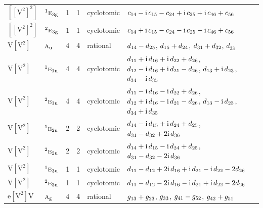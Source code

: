 \documentclass[10pt,a4paper]{article}
\numberwithin{equation}{section}
\newcommand{\irr}[1]{\text{\normalfont\scshape #1}}
\newcommand{\conjpair}[1]{{}^{#1}}
\newcommand{\ptag}[1]{\mathrm{#1}}
\newcommand{\iunit}{\mathrm{i}}
\newcommand{\jahn}[1]{\mathrm{#1}}
\newlength{\fillwidth}\newlength{\cellwidth}\newlength{\colwidth}
\newcommand{\signbreak}{\penalty100\relax}
\begin{document}
{\begin{longtable}{@{}llrrl>{\RaggedRight\arraybackslash}p{\fillwidth}@{}}
$\jahn{[[V^{2}]^{2}]}$ & $\conjpair{1}\irr{e}_{3\ptag{g}}$ & 1 & 1 & cyclotomic & $c_{14} -\signbreak \iunit{}\,c_{15} -\signbreak c_{24} +\signbreak \iunit{}\,c_{25} +\signbreak \iunit{}\,c_{46} +\signbreak c_{56}$\\
$\jahn{[[V^{2}]^{2}]}$ & $\conjpair{2}\irr{e}_{3\ptag{g}}$ & 1 & 1 & cyclotomic & $c_{14} +\signbreak \iunit{}\,c_{15} -\signbreak c_{24} -\signbreak \iunit{}\,c_{25} -\signbreak \iunit{}\,c_{46} +\signbreak c_{56}$\\
$\jahn{V[V^{2}]}$ & $\irr{a}_{\ptag{u}}$ & 4 & 4 & rational & $d_{14} -\signbreak d_{25}$, $d_{15} +\signbreak d_{24}$, $d_{31} +\signbreak d_{32}$, $d_{33}$\\
$\jahn{V[V^{2}]}$ & $\conjpair{1}\irr{e}_{1\ptag{u}}$ & 4 & 4 & cyclotomic & $d_{11} +\signbreak \iunit{}\,d_{16} +\signbreak \iunit{}\,d_{22} +\signbreak d_{26}$, $d_{12} -\signbreak \iunit{}\,d_{16} +\signbreak \iunit{}\,d_{21} -\signbreak d_{26}$, $d_{13} +\signbreak \iunit{}\,d_{23}$, $d_{34} -\signbreak \iunit{}\,d_{35}$\\
$\jahn{V[V^{2}]}$ & $\conjpair{2}\irr{e}_{1\ptag{u}}$ & 4 & 4 & cyclotomic & $d_{11} -\signbreak \iunit{}\,d_{16} -\signbreak \iunit{}\,d_{22} +\signbreak d_{26}$, $d_{12} +\signbreak \iunit{}\,d_{16} -\signbreak \iunit{}\,d_{21} -\signbreak d_{26}$, $d_{13} -\signbreak \iunit{}\,d_{23}$, $d_{34} +\signbreak \iunit{}\,d_{35}$\\
$\jahn{V[V^{2}]}$ & $\conjpair{1}\irr{e}_{2\ptag{u}}$ & 2 & 2 & cyclotomic & $d_{14} -\signbreak \iunit{}\,d_{15} +\signbreak \iunit{}\,d_{24} +\signbreak d_{25}$, $d_{31} -\signbreak d_{32} +\signbreak 2\iunit{}\,d_{36}$\\
$\jahn{V[V^{2}]}$ & $\conjpair{2}\irr{e}_{2\ptag{u}}$ & 2 & 2 & cyclotomic & $d_{14} +\signbreak \iunit{}\,d_{15} -\signbreak \iunit{}\,d_{24} +\signbreak d_{25}$, $d_{31} -\signbreak d_{32} -\signbreak 2\iunit{}\,d_{36}$\\
$\jahn{V[V^{2}]}$ & $\conjpair{1}\irr{e}_{3\ptag{u}}$ & 1 & 1 & cyclotomic & $d_{11} -\signbreak d_{12} +\signbreak 2\iunit{}\,d_{16} +\signbreak \iunit{}\,d_{21} -\signbreak \iunit{}\,d_{22} -\signbreak 2d_{26}$\\
$\jahn{V[V^{2}]}$ & $\conjpair{2}\irr{e}_{3\ptag{u}}$ & 1 & 1 & cyclotomic & $d_{11} -\signbreak d_{12} -\signbreak 2\iunit{}\,d_{16} -\signbreak \iunit{}\,d_{21} +\signbreak \iunit{}\,d_{22} -\signbreak 2d_{26}$\\
$\jahn{e[V^{2}]V}$ & $\irr{a}_{\ptag{g}}$ & 4 & 4 & rational & $\mathnormal{g}_{13} +\signbreak \mathnormal{g}_{23}$, $\mathnormal{g}_{33}$, $\mathnormal{g}_{41} -\signbreak \mathnormal{g}_{52}$, $\mathnormal{g}_{42} +\signbreak \mathnormal{g}_{51}$\\

\end{longtable}}
\end{document}
